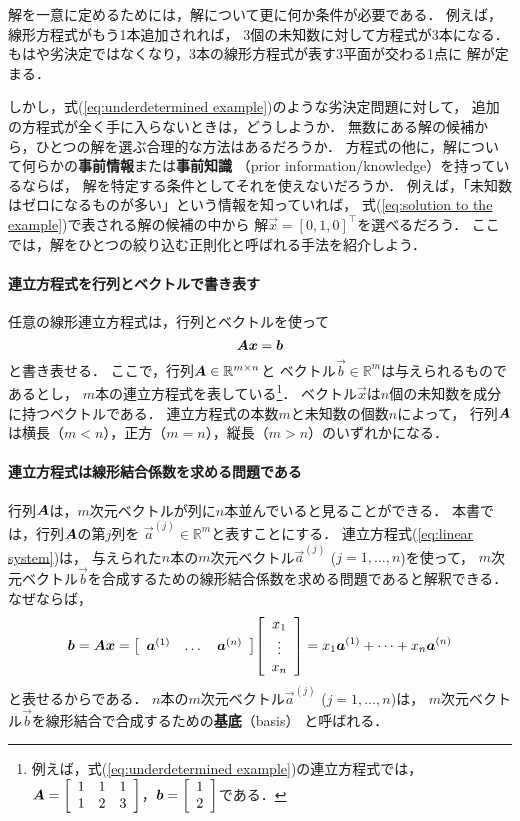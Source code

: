 解を一意に定めるためには，解について更に何か条件が必要である．
例えば，線形方程式がもう1本追加されれば，
3個の未知数に対して方程式が3本になる．
もはや劣決定ではなくなり，3本の線形方程式が表す3平面が交わる1点に
解が定まる．

しかし，式(\ref{eq:underdetermined example})のような劣決定問題に対して，
追加の方程式が全く手に入らないときは，どうしようか．
無数にある解の候補から，ひとつの解を選ぶ合理的な方法はあるだろうか．
方程式の他に，解について何らかの{\bf 事前情報}または{\bf 事前知識}
（prior information/knowledge）を持っているならば，
解を特定する条件としてそれを使えないだろうか．
例えば，「未知数はゼロになるものが多い」という情報を知っていれば，
式(\ref{eq:solution to the example})で表される解の候補の中から
解$\vec x=[0,1,0]^\top$を選べるだろう．
ここでは，解をひとつの絞り込む正則化と呼ばれる手法を紹介しよう．



\paragraph{連立方程式を行列とベクトルで書き表す}

任意の線形連立方程式は，行列とベクトルを使って
\begin{equation}
 \mtr A\vec x=\vec b
\label{eq:linear system}
\end{equation}
と書き表せる．
ここで，行列$\mtr A\in\mathbb{R}^{m\times n}$と
ベクトル$\vec b\in\mathbb{R}^m$は与えられるものであるとし，
$m$本の連立方程式を表している\footnote{%
例えば，式(\ref{eq:underdetermined example})の連立方程式では，
$\mtr A=\bmatrix{ccc}{1 & 1 & 1\\ 1 & 2 & 3}$，$\vec b=\bmatrix{c}{1\\ 2}$である．}．
ベクトル$\vec x$は$n$個の未知数を成分に持つベクトルである．
連立方程式の本数$m$と未知数の個数$n$によって，
行列$\mtr A$は横長（$m<n$），正方（$m=n$），縦長（$m>n$）のいずれかになる．


\paragraph{連立方程式は線形結合係数を求める問題である}

行列$\mtr A$は，$m$次元ベクトルが列に$n$本並んでいると見ることができる．
本書では，行列$\mtr A$の第$j$列を
$\vec a^{(j)}\in\mathbb{R}^m$と表すことにする．
連立方程式(\ref{eq:linear system})は，
与えられた$n$本の$m$次元ベクトル$\vec a^{(j)}$ ($j=1,\dots,n$)を使って，
$m$次元ベクトル$\vec b$を合成するための線形結合係数を求める問題であると解釈できる．
なぜならば，
\begin{equation}
 \vec b=\mtr A\vec x
=\smatrix{\normalsize}{ccc}{\vec a^{(1)} & \dots & \vec a^{(n)}}
\smatrix{\normalsize}{c}{x_1\\ \vdots\\ x_n}
=x_1\vec a^{(1)}+\cdots+x_n\vec a^{(n)}
\label{eq:linear combination}
\end{equation}
と表せるからである．
$n$本の$m$次元ベクトル$\vec a^{(j)}$ ($j=1,\dots,n$)は，
$m$次元ベクトル$\vec b$を線形結合で合成するための{\bf 基底}（basis）
と呼ばれる．

